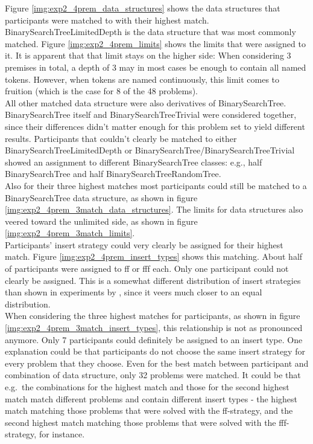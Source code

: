 \documentclass[hidelinks]{scrartcl}
\begin{document}
Figure \ref{img:exp2_4prem_data_structures} shows the data structures that participants were matched to with their highest match. BinarySearchTreeLimitedDepth is the data structure that was most commonly matched. Figure \ref{img:exp2_4prem_limits} shows the limits that were assigned to it. It is apparent that that limit stays on the higher side: When considering 3 premises in total, a depth of 3 may in most cases be enough to contain all named \gls{token}s. However, when \gls{token}s are named continuously, this limit comes to fruition (which is the case for 8 of the 48 problems). \\
All other matched data structure were also derivatives of BinarySearchTree. BinarySearchTree itself and BinarySearchTreeTrivial were considered together, since their differences didn't matter enough for this problem set to yield different results. Participants that couldn't clearly be matched to either BinarySearchTreeLimitedDepth or BinarySearchTree/BinarySearchTreeTrivial showed an assignment to different BinarySearchTree classes: e.g., half BinarySearchTree and half BinarySearchTreeRandomTree. \\
Also for their three highest matches most participants could still be matched to a BinarySearchTree data structure, as shown in figure \ref{img:exp2_4prem_3match_data_structures}. The limits for data structures also veered toward the unlimited side, as shown in figure \ref{img:exp2_4prem_3match_limits}. \\
Participants' insert strategy could very clearly be assigned for their highest match. Figure \ref{img:exp2_4prem_insert_types} shows this matching. About half of participants were assigned to ff or fff each. Only one participant could not clearly be assigned. This is a somewhat different distribution of insert strategies than shown in experiments by \cite{Ragni.2013}, since it veers much closer to an equal distribution. \\
When considering the three highest matches for participants, as shown in figure \ref{img:exp2_4prem_3match_insert_types}, this relationship is not as pronounced anymore. Only 7 participants could definitely be assigned to an insert type. One explanation could be that participants do not choose the same insert strategy for every problem that they choose. Even for the best match between participant and combination of data structure, only 32 problems were matched. It could be that e.g.\ the combinations for the highest match and those for the second highest match match different problems and contain different insert types - the highest match matching those problems that were solved with the ff-strategy, and the second highest match matching those problems that were solved with the fff-strategy, for instance. \\
\end{document}

